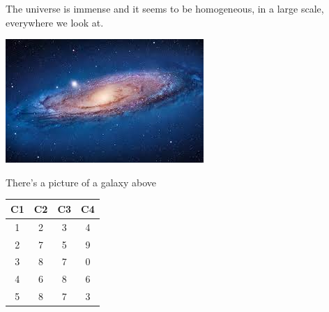 \documentclass{article}
\begin{document}
The universe is immense and it seems to be homogeneous, in a large scale, everywhere we look at.
 
\includegraphics{galaxy.jpg}
 
There's a picture of a galaxy above




\begin{table} [h!]
	\centering
	\begin{tabular}{ || c c c c || }
		\hline
		C1 & C2 & C3 & C4 \\ [0.5ex]
		\hline
		1 & 2 & 3 & 4 \\ 
		2 & 7 & 5 & 9 \\
		3 & 8 & 7 & 0 \\
		4 & 6 & 8 & 6 \\
		5 & 8 & 7 & 3 \\ [1ex]
		\hline
	\end{tabular}
\end{table}
\end{document}
